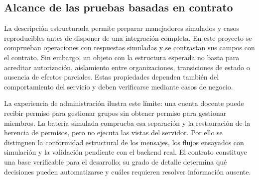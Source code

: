 \subsection{Alcance de las pruebas basadas en contrato}

La descripción estructurada permite preparar manejadores simulados y casos
reproducibles antes de disponer de una integración completa. En este proyecto
se comprueban operaciones con respuestas simuladas y se contrastan sus campos
con el contrato. Sin embargo, un objeto con la estructura esperada no basta
para acreditar autorización, aislamiento entre organizaciones, transiciones
de estado o ausencia de efectos parciales. Estas propiedades dependen también
del comportamiento del servicio y deben verificarse mediante casos de negocio.

La experiencia de administración ilustra este límite: una cuenta docente puede
recibir permiso para gestionar grupos sin obtener permiso para gestionar
miembros. La batería simulada comprueba esa separación y la restauración de
la herencia de permisos, pero no ejecuta las vistas del servidor. Por ello se
distinguen la conformidad estructural de los mensajes, los flujos ensayados con
simulación y la validación pendiente con el backend real. El contrato constituye
una base verificable para el desarrollo; su grado de detalle determina qué
decisiones pueden automatizarse y cuáles requieren resolver información ausente.
